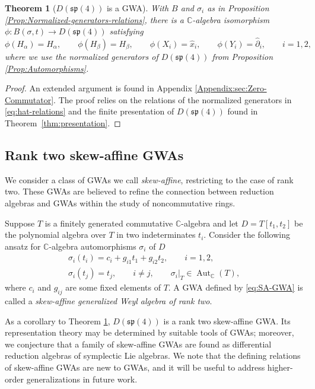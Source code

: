 \documentclass[10pt,a4paper]{amsart}
\numberwithin{equation}{section}
\newtheorem{Theorem}{Theorem}[section]
\DeclareMathOperator{\Aut}{Aut}
\begin{document}
\begin{Theorem}[$D(\mathfrak{sp}(4))$ is a GWA]\label{thm:GWA-realization}
	With $B$ and $\sigma_{i}$ as in Proposition {\rm\ref{Prop:Normalized-generators-relations}}, there is a $\mathbb{C}$-algebra isomorphism
$\phi\colon B(\sigma,t) \longrightarrow D(\mathfrak{sp}(4))
$
	satisfying
	\[\phi(H_\alpha)=H_\alpha,\qquad
	\phi(H_\beta)=H_\beta,\qquad
	\phi(X_i)=\hat x_i,\qquad
	\phi(Y_i)=\hat \partial_i,\qquad i=1,2,
	\]
	where we use the normalized generators of $D(\mathfrak{sp}(4))$ from Proposition {\rm\ref{Prop:Automorphisms}}.
\end{Theorem}
\begin{proof}
	An extended argument is found in Appendix \ref{Appendix:sec:Zero-Commutator}. The proof relies on the relations of the normalized generators in \eqref{eq:hat-relations} and the finite presentation of $D(\mathfrak{sp}(4))$ found in Theorem~\ref{thm:presentation}.
\end{proof}

\subsection{Rank two skew-affine GWAs}\label{subsec:GWA-skew-affine}
We consider a class of GWAs we call \emph{skew-affine}, restricting to the case of rank two. These GWAs are believed to refine the connection \cite{vandenhomberghNoteMickelssonStep1975} between reduction algebras and GWAs within the study of noncommutative rings.

\begin{Definition}\label{def:SA-GWArank2}
	Suppose $T$ is a finitely generated commutative $\mathbb{C}$-algebra and let $D=T[t_1,t_2]$ be the polynomial algebra over $T$ in two indeterminates $t_i$. Consider the following ansatz for $\mathbb{C}$-algebra automorphisms $\sigma_i$ of $D$
	\begin{gather}\label{eq:SA-GWA}
		\sigma_i(t_i)=c_i+g_{i1}t_1+g_{i2}t_2,\qquad i=1,2,\\
		\sigma_i(t_j)=t_j,\qquad i\neq j,\qquad
		\sigma_i|_T\in\Aut_\mathbb{C}(T),\nonumber
	\end{gather}
	where $c_i$ and $g_{ij}$ are some fixed elements of $T$. A GWA defined by \eqref{eq:SA-GWA} is called a \emph{skew-affine generalized Weyl algebra of rank two}.
\end{Definition}


As a corollary to Theorem \ref{thm:GWA-realization}, $D(\mathfrak{sp}(4))$ is a rank two skew-affine GWA. Its representation theory may be determined by suitable tools of GWAs; moreover, we conjecture that a family of skew-affine GWAs are found as differential reduction algebras of symplectic Lie algebras. We note that the defining relations of skew-affine GWAs are new to GWAs, and it will be useful to address higher-order generalizations in future work.
\end{document}
